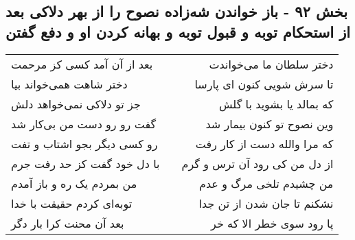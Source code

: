 \begin{center}
\section*{بخش ۹۲ - باز خواندن شه‌زاده نصوح را از بهر دلاکی بعد از استحکام توبه و قبول توبه و بهانه کردن او و دفع گفتن}
\label{sec:sh092}
\begin{longtable}{l p{0.5cm} r}
بعد از آن آمد کسی کز مرحمت
&&
دختر سلطان ما می‌خواندت
\\
دختر شاهت همی‌خواند بیا
&&
تا سرش شویی کنون ای پارسا
\\
جز تو دلاکی نمی‌خواهد دلش
&&
که بمالد یا بشوید با گلش
\\
گفت رو رو دست من بی‌کار شد
&&
وین نصوح تو کنون بیمار شد
\\
رو کسی دیگر بجو اشتاب و تفت
&&
که مرا والله دست از کار رفت
\\
با دل خود گفت کز حد رفت جرم
&&
از دل من کی رود آن ترس و گرم
\\
من بمردم یک ره و باز آمدم
&&
من چشیدم تلخی مرگ و عدم
\\
توبه‌ای کردم حقیقت با خدا
&&
نشکنم تا جان شدن از تن جدا
\\
بعد آن محنت کرا بار دگر
&&
پا رود سوی خطر الا که خر
\\
\end{longtable}
\end{center}
